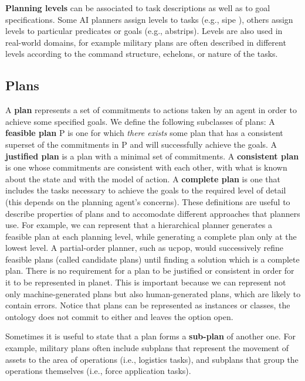 {\bf Planning levels} can be associated to task descriptions as well as
to goal specifications.  Some AI planners assign levels to tasks (e.g.,
{\sc sipe} \cite{wilkins88}), others assign levels to particular
predicates or goals (e.g., {\sc abstrips}).  Levels are also used in
real-world domains, for example military plans are often described in
different levels according to the command structure, echelons, or nature
of the tasks.


\subsection{Plans}

A {\bf plan} represents a set of commitments to actions
taken by an agent in order to achieve some specified goals.
We define the following subclasses of plans:
A {\bf feasible plan} P is one for which {\em there exists} some plan that has
a consistent superset of the commitments in P and will successfully
achieve the goals.
A {\bf justified plan} is a plan with a minimal set of commitments.
A {\bf consistent plan} is one whose
commitments are consistent with each other, with what is known about the
state and with the model of action.
A {\bf complete plan} is one that includes the tasks necessary to achieve the goals
to the required level of detail 
(this depends on the planning agent's concerns).
These definitions are useful to 
describe properties of plans 
and to accomodate different approaches that planners use.  
For example, we can represent that a hierarchical planner
generates a feasible plan at each planning level, while generating 
a complete plan only at the lowest level.  A partial-order planner, 
such as {\sc ucpop}, would successively refine feasible plans (called 
candidate plans) until finding a solution which is a complete plan.
There is no requirement for a plan to be justified or consistent
in order for it to be represented in {\sc planet}. This is 
important because we can represent not only machine-generated plans but also
human-generated plans, which are likely to contain errors.
Notice that plans can be represented as instances or classes, 
the ontology does not commit to either and leaves the option open.


Sometimes it is useful to state that a
plan forms a {\bf sub-plan} of another one. 
For example,
military plans often include subplans that represent the 
movement of assets to the area of operations
(i.e., logistics tasks),
and subplans that group the operations themselves 
(i.e., force application tasks).


